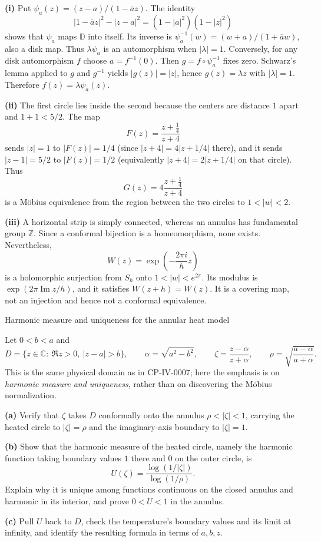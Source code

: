 \begin{solution}
\textbf{(i)} Put $\psi_a(z)=(z-a)/(1-\overline a z)$. The identity
\[|1-\overline a z|^2-|z-a|^2=(1-|a|^2)(1-|z|^2)\]
shows that $\psi_a$ maps $\mathbb D$ into itself. Its inverse is $\psi_a^{-1}(w)=(w+a)/(1+\overline a w)$, also a disk map. Thus $\lambda\psi_a$ is an automorphism when $|\lambda|=1$. Conversely, for any disk automorphism $f$ choose $a=f^{-1}(0)$. Then $g=f\circ\psi_a^{-1}$ fixes zero. Schwarz's lemma applied to $g$ and $g^{-1}$ yields $|g(z)|=|z|$, hence $g(z)=\lambda z$ with $|\lambda|=1$. Therefore $f(z)=\lambda\psi_a(z)$.

\textbf{(ii)} The first circle lies inside the second because the centers are distance $1$ apart and $1+1<5/2$. The map
\[F(z)=\frac{z+\tfrac14}{z+4}\]
sends $|z|=1$ to $|F(z)|=1/4$ (since $|z+4|=4|z+1/4|$ there), and it sends $|z-1|=5/2$ to $|F(z)|=1/2$ (equivalently $|z+4|=2|z+1/4|$ on that circle). Thus
\[\boxed{G(z)=4\frac{z+\tfrac14}{z+4}}\]
is a Möbius equivalence from the region between the two circles to $1<|w|<2$.

\textbf{(iii)} A horizontal strip is simply connected, whereas an annulus has fundamental group $\mathbb Z$. Since a conformal bijection is a homeomorphism, none exists. Nevertheless,
\[W(z)=\exp\!\left(-\frac{2\pi i}{h}z\right)\]
is a holomorphic surjection from $S_h$ onto $1<|w|<e^{2\pi}$. Its modulus is $\exp(2\pi\operatorname{Im}z/h)$, and it satisfies $W(z+h)=W(z)$. It is a covering map, not an injection and hence not a conformal equivalence.
\end{solution}

\begin{problem}[CP-IV-0124]
\label{prob:cp-iv-0124}
Harmonic measure and uniqueness for the annular heat model

Let $0<b<a$ and
\[
D=\{z\in\mathbb C:\ \Re z>0,\ |z-a|>b\},\qquad
\alpha=\sqrt{a^2-b^2},\qquad
\zeta=\frac{z-\alpha}{z+\alpha},\qquad
\rho=\sqrt{\frac{a-\alpha}{a+\alpha}}.
\]
This is the same physical domain as in CP-IV-0007; here the emphasis is on
\emph{harmonic measure and uniqueness}, rather than on discovering the
M\"obius normalization.

\par\noindent\textbf{(a)} Verify that $\zeta$ takes $D$ conformally onto the
annulus $\rho<|\zeta|<1$, carrying the heated circle to $|\zeta|=\rho$
and the imaginary-axis boundary to $|\zeta|=1$.

\par\noindent\textbf{(b)} Show that the harmonic measure of the heated circle,
namely the harmonic function taking boundary values $1$ there and $0$ on
the outer circle, is
\[
U(\zeta)=\frac{\log(1/|\zeta|)}{\log(1/\rho)}.
\]
Explain why it is unique among functions continuous on the closed annulus
and harmonic in its interior, and prove $0<U<1$ in the annulus.

\par\noindent\textbf{(c)} Pull $U$ back to $D$, check the temperature's boundary
values and its limit at infinity, and identify the resulting formula in
terms of $a,b,z$.

\end{problem}

